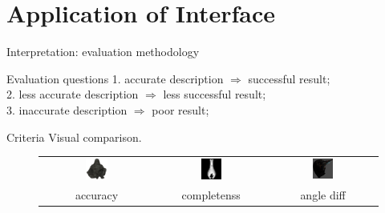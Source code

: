 \documentclass[10pt]{beamer}
\begin{document}
\section{Application of Interface}
\begin{frame}{Interpretation: evaluation methodology}

\begin{exampleblock}{Evaluation questions}
  1. accurate description $\Rightarrow$ successful result; \\
  2. less accurate description $\Rightarrow$ less successful result;\\
  3. inaccurate description $\Rightarrow$ poor result; \\
\end{exampleblock}

\begin{exampleblock}{Criteria}
  Visual comparison.
\end{exampleblock}

\begin{figure}
\centering
\begin{tabular}{ccc}
\includegraphics[width=0.2\textwidth]{interp/synth_interp/budda_vh} &
\includegraphics[width=0.2\textwidth]{interp/synth_interp/vase0_sl} &
\includegraphics[width=0.2\textwidth]{interp/real_interp/vase/vase_spike} \\
accuracy & completenss & angle diff \\
\end{tabular}
\end{figure}

\end{frame}
\end{document}
